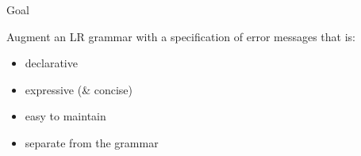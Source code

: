 \documentclass[aspectratio=169]{beamer}          %
\begin{document}
\begin{frame}{Goal}

  Augment an LR grammar with a specification of error messages that is:
  \begin{itemize}
    \item declarative
    \item expressive (\& concise)
    \item easy to maintain
    \item separate from the grammar
  \end{itemize}
\end{frame}
\end{document}
